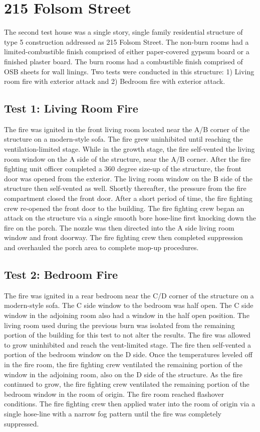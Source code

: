 \documentclass{article}
\begin{document}
\section{215 Folsom Street}

The second test house was a single story, single family residential structure of type 5 construction addressed as 215 Folsom Street. The non-burn rooms had a limited-combustible finish comprised of either paper-covered gypsum board or a finished plaster board.  The burn rooms had a combustible finish comprised of OSB sheets for wall linings.  Two tests were conducted in this structure: 1) Living room fire with exterior attack and 2) Bedroom fire with exterior attack.  

\subsection{Test 1: Living Room Fire}

The fire was ignited in the front living room located near the A/B corner of the structure on a modern-style sofa. The fire grew uninhibited until reaching the ventilation-limited stage. While in the growth stage, the fire self-vented the living room window on the A side of the structure, near the A/B corner. After the fire fighting unit officer completed a 360 degree size-up of the structure, the front door was opened from the exterior.  The living room window on the B side of the structure then self-vented as well.  Shortly thereafter, the pressure from the fire compartment closed the front door.  After a short period of time, the fire fighting crew re-opened the front door to the building. The fire fighting crew began an attack on the structure via a single smooth bore hose-line first knocking down the fire on the porch.  The nozzle was then directed into the A side living room window and front doorway. The fire fighting crew then completed suppression and overhauled the porch area to complete mop-up procedures.

\subsection{Test 2: Bedroom Fire}

The fire was ignited in a rear bedroom near the C/D corner of the structure on a modern-style sofa.  The C side window to the bedroom was half open.  The C side window in the adjoining room also had a window in the half open position. The living room used during the previous burn was isolated from the remaining portion of the building for this test to not alter the results. The fire was allowed to grow uninhibited and reach the vent-limited stage. The fire then self-vented a portion of the bedroom window on the D side. Once the temperatures leveled off in the fire room, the fire fighting crew ventilated the remaining portion of the window in the adjoining room, also on the D side of the structure. As the fire continued to grow, the fire fighting crew ventilated the remaining portion of the bedroom window in the room of origin. The fire room reached flashover conditions.  The fire fighting crew then applied water into the room of origin via a single hose-line with a narrow fog pattern until the fire was completely suppressed.     
\end{document}
